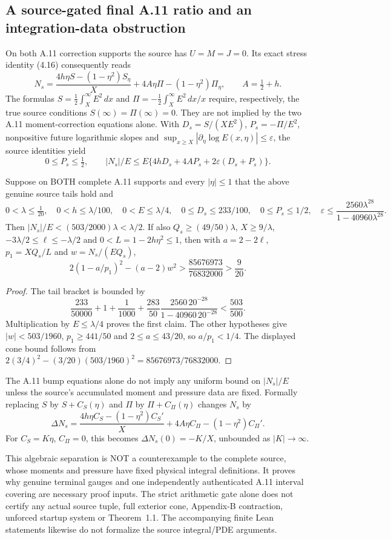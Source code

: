 \subsection*{A source-gated final A.11 ratio and an integration-data obstruction}
\label{subsec:a11-source-gated-ratio-20261021}
On both A.11 correction supports the source has $U=M=J=0$.
Its exact stress identity (4.16) consequently reads
\[
N_s=\frac{4h\eta S-(1-\eta^2)S_\eta}{X}
+4A\eta\Pi-(1-\eta^2)\Pi_\eta,\qquad A=\tfrac12+h.
\]
The formulas
$S=\frac12\int_X^\infty E^2\,dx$ and
$\Pi=-\frac12\int_X^\infty E^2\,dx/x$
require, respectively, the true source conditions
$S(\infty)=\Pi(\infty)=0$. They are not implied by the
two A.11 moment-correction equations alone.
With $D_s=S/(XE^2)$, $P_s=-\Pi/E^2$, nonpositive
future logarithmic slopes and
$\sup_{x\ge X}|\partial_\eta\log E(x,\eta)|\le\varepsilon$,
the source identities yield
\[
0\le P_s\le\tfrac12,\qquad
|N_s|/E\le E\{4hD_s+4AP_s+2\varepsilon(D_s+P_s)\}.
\]
\begin{proposition}
\label{prop:a11-final-gate-20261021}
Suppose on BOTH complete A.11 supports and every $|\eta|\le1$
that the above genuine source tails hold and
\[
0<\lambda\le\tfrac1{20},\quad0<h\le\lambda/100,\quad
0<E\le\lambda/4,\quad0\le D_s\le233/100,\quad
0\le P_s\le1/2,\quad
\varepsilon\le\frac{2560\lambda^{28}}{1-40960\lambda^{28}}.
\]
Then $|N_s|/E<(503/2000)\lambda<\lambda/2$.
If also $Q_s\ge(49/50)\lambda$, $X\ge9/\lambda$,
$-3\lambda/2\le\ell\le-\lambda/2$ and
$0<L=1-2h\eta^2\le1$, then with
$a=2-2\ell$, $p_1=XQ_s/L$ and $w=N_s/(EQ_s)$,
\[
2(1-a/p_1)^2-(a-2)w^2>
\frac{85676973}{76832000}>\frac9{20}.
\]
\end{proposition}
\begin{proof}
The tail bracket is bounded by
\[
\frac{233}{50000}+1+\frac1{1000}
+\frac{283}{50}\frac{2560\,20^{-28}}{1-40960\,20^{-28}}
<\frac{503}{500}.
\]
Multiplication by $E\le\lambda/4$ proves the first claim.
The other hypotheses give
$|w|<503/1960$, $p_1\ge441/50$ and
$2\le a\le43/20$, so $a/p_1<1/4$.
The displayed cone bound follows from
$2(3/4)^2-(3/20)(503/1960)^2
=85676973/76832000$.
\end{proof}
\begin{proposition}
\label{prop:a11-gauge-obstruction-20261021}
The A.11 bump equations alone do not imply any uniform
bound on $|N_s|/E$ unless the source's accumulated moment
and pressure data are fixed. Formally replacing
$S$ by $S+C_S(\eta)$ and $\Pi$ by $\Pi+C_\Pi(\eta)$
changes $N_s$ by
\[
\Delta N_s=
\frac{4h\eta C_S-(1-\eta^2)C_S'}{X}
+4A\eta C_\Pi-(1-\eta^2)C_\Pi'.
\]
For $C_S=K\eta$, $C_\Pi=0$, this becomes
$\Delta N_s(0)=-K/X$, unbounded as $|K|\to\infty$.
\end{proposition}
This algebraic separation is NOT a counterexample to the
complete source, whose moments and pressure have fixed physical
integral definitions. It proves why genuine terminal gauges and
one independently authenticated A.11 interval covering are
necessary proof inputs. The strict arithmetic gate alone
does not certify any actual source tuple, full exterior cone,
Appendix-B contraction, unforced startup system or
Theorem~1.1. The accompanying finite Lean statements likewise
do not formalize the source integral/PDE arguments.
